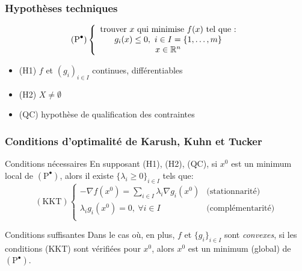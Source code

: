\begin{frame}
  \frametitle{Hypothèses techniques}

  \[
  (\text{P}^\bullet) \left\{
  \begin{array}{c}
    \text{trouver} \ x \ \text{qui minimise} \ f(x) \ \text{tel que :} \\
    g_i(x) \leq 0, \ i \in I = \{1, \dots, m\} \\
    x \in {\ensuremath\mathbb{R}}^n
  \end{array}
  \right.
  \]

  \begin{itemize}
  \item (H1) $f$ et $(g_i)_{i \in I}$ continues, différentiables
  \item (H2) $X \neq \emptyset$
  \item (QC) hypothèse de qualification des contraintes
  \end{itemize}
  
\end{frame}

\begin{frame}
  \frametitle{Conditions d'optimalité de Karush, Kuhn et Tucker}

  \begin{block}{Conditions nécessaires}
    En supposant (H1), (H2), (QC), si $x^0$ est un minimum local de $(\text{P}^\bullet)$,
    alors il existe $\{\lambda_i \geq 0\}_{i \in I}$ tels que:
    \[
    (\text{KKT})
    \left\{
    \begin{array}{ll}
      -{\nabla f}(x^0) = \sum_{i \in I} \lambda_i {\nabla g_i}(x^0)
      & \text{(stationnarité)} \\
      \lambda_i g_i(x^0) = 0, \ \forall i \in I
      & \text{(complémentarité)} \\
    \end{array}
    \right.
    \]
  \end{block}

  \begin{block}{Conditions suffisantes}
    Dans le cas où, en plus, $f$ et $\{g_i\}_{i\in I}$ sont \emph{convexes},
    si les conditions (KKT) sont vérifiées pour $x^0$, alors $x^0$ est un minimum
    (global) de $(\text{P}^\bullet)$.  
  \end{block}
  
\end{frame}

